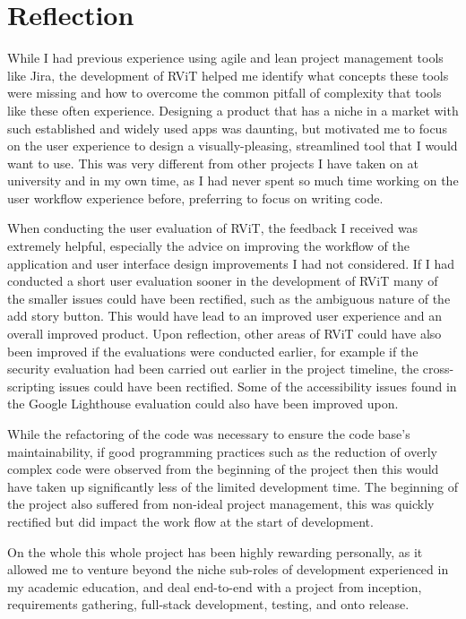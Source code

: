 \documentclass[l4proj.tex]{subfiles}
\begin{document}
\section{Reflection}
While I had previous experience using agile and lean project management tools like Jira, the development of RViT helped me identify what concepts these tools were missing and how to overcome the common pitfall of complexity that tools like these often experience. Designing a product that has a niche in a market with such established and widely used apps was daunting, but motivated me to focus on the user experience to design a visually-pleasing, streamlined tool that I would want to use. This was very different from other projects I have taken on at university and in my own time, as I had never spent so much time working on the user workflow experience before, preferring to focus on writing code. 

When conducting the user evaluation of RViT, the feedback I received was extremely helpful, especially the advice on improving the workflow of the application and user interface design improvements I had not considered. If I had conducted a short user evaluation sooner in the development of RViT many of the smaller issues could have been rectified, such as the ambiguous nature of the add story button. This would have lead to an improved user experience and an overall improved product. Upon reflection, other areas of RViT could have also been improved if the evaluations were conducted earlier, for example if the security evaluation had been carried out earlier in the project timeline, the cross-scripting issues could have been rectified. Some of the accessibility issues found in the Google Lighthouse evaluation could also have been improved upon.

While the refactoring of the code was necessary to ensure the code base's maintainability, if good programming practices such as the reduction of overly complex code were observed from the beginning of the project then this would have taken up significantly less of the limited development time. The beginning of the project also suffered from non-ideal project management, this was quickly rectified but did impact the work flow at the start of development.  

On the whole this whole project has been highly rewarding personally, as it allowed me to venture beyond the niche sub-roles of development experienced in my academic education, and deal end-to-end with a project from inception, requirements gathering, full-stack development, testing, and onto release.
\end{document}
